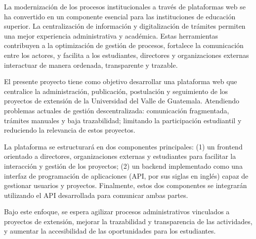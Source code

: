 La modernización de los procesos institucionales a través de plataformas web se ha convertido en un componente 
esencial para las instituciones de educación superior. La centralización de información y digitalización de trámites 
permiten una mejor experiencia administrativa y académica. Estas herramientas contribuyen a la optimización de gestión
de procesos, fortalece la comunicación entre los actores, y facilita a los estudiantes, directores y organizaciones 
externas interactuar de manera ordenada, transparente y trazable.

El presente proyecto tiene como objetivo desarrollar una plataforma web que centralice la administración, publicación, 
postulación y seguimiento de los proyectos de extensión de la Universidad del Valle de Guatemala. Atendiendo problemas 
actuales de gestión descentralizada: comunicación fragmentada, trámites manuales y baja trazabilidad; limitando la 
participación estudiantil y reduciendo la relevancia de estos proyectos.

La plataforma se estructurará en dos componentes principales: (1) un frontend orientado a directores, organizaciones 
externas y estudiantes para facilitar la interacción y gestión de los proyectos; (2) un backend implementado como una 
interfaz de programación de aplicaciones (API, por sus siglas en inglés) capaz de gestionar usuarios y proyectos. 
Finalmente, estos dos componentes se integrarán utilizando el API desarrollada para comunicar ambas partes. 

Bajo este enfoque, se espera agilizar procesos administrativos vinculados a proyectos de extensión, mejorar la 
trazabilidad y transparencia de las actividades, y aumentar la accesibilidad de las oportunidades para los estudiantes.
